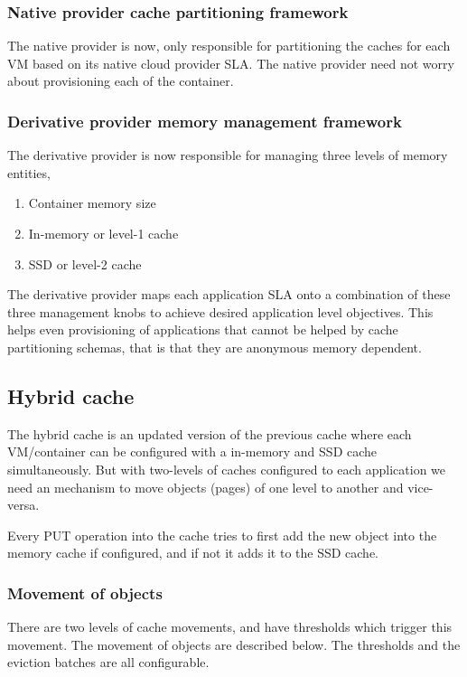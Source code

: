       \subsubsection{Native provider cache partitioning framework}
	The native provider is now, only responsible for partitioning the caches for each VM
	based on its native cloud provider SLA. The native provider need not worry about 
	provisioning each of the container.

      \subsubsection{Derivative provider memory management framework}	
	The derivative provider is now responsible for managing three levels of memory entities,
	
	\begin{enumerate}
	  \item Container memory size
	  \item In-memory or level-1 cache
	  \item SSD or level-2 cache
	\end{enumerate}
	
	The derivative provider maps each application SLA onto a combination of these three management
	knobs to achieve desired application level objectives. This helps even provisioning of applications
	that cannot be helped by cache partitioning schemas, that is that they are anonymous memory dependent.


    \subsection{Hybrid cache}
      The hybrid cache is an updated version of the previous cache where each VM/container can be configured
      with a in-memory and SSD cache simultaneously. But with two-levels of caches configured to each application
      we need an mechanism to move objects (pages) of one level to another and vice-versa.
      
      Every PUT operation into the cache tries to first add the new object into the memory cache if configured, 
      and if not it adds it to the SSD cache.
      
      \subsubsection{Movement of objects}	
	There are two levels of cache movements, and have thresholds which trigger this movement. The movement of
	objects are described below. The thresholds and the eviction batches are all configurable.
	

